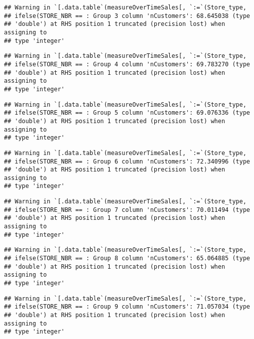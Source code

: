 \documentclass[
]{article}
\begin{document}
\begin{verbatim}
## Warning in `[.data.table`(measureOverTimeSales[, `:=`(Store_type,
## ifelse(STORE_NBR == : Group 3 column 'nCustomers': 68.645038 (type
## 'double') at RHS position 1 truncated (precision lost) when assigning to
## type 'integer'
\end{verbatim}

\begin{verbatim}
## Warning in `[.data.table`(measureOverTimeSales[, `:=`(Store_type,
## ifelse(STORE_NBR == : Group 4 column 'nCustomers': 69.783270 (type
## 'double') at RHS position 1 truncated (precision lost) when assigning to
## type 'integer'
\end{verbatim}

\begin{verbatim}
## Warning in `[.data.table`(measureOverTimeSales[, `:=`(Store_type,
## ifelse(STORE_NBR == : Group 5 column 'nCustomers': 69.076336 (type
## 'double') at RHS position 1 truncated (precision lost) when assigning to
## type 'integer'
\end{verbatim}

\begin{verbatim}
## Warning in `[.data.table`(measureOverTimeSales[, `:=`(Store_type,
## ifelse(STORE_NBR == : Group 6 column 'nCustomers': 72.340996 (type
## 'double') at RHS position 1 truncated (precision lost) when assigning to
## type 'integer'
\end{verbatim}

\begin{verbatim}
## Warning in `[.data.table`(measureOverTimeSales[, `:=`(Store_type,
## ifelse(STORE_NBR == : Group 7 column 'nCustomers': 70.011494 (type
## 'double') at RHS position 1 truncated (precision lost) when assigning to
## type 'integer'
\end{verbatim}

\begin{verbatim}
## Warning in `[.data.table`(measureOverTimeSales[, `:=`(Store_type,
## ifelse(STORE_NBR == : Group 8 column 'nCustomers': 65.064885 (type
## 'double') at RHS position 1 truncated (precision lost) when assigning to
## type 'integer'
\end{verbatim}

\begin{verbatim}
## Warning in `[.data.table`(measureOverTimeSales[, `:=`(Store_type,
## ifelse(STORE_NBR == : Group 9 column 'nCustomers': 71.057034 (type
## 'double') at RHS position 1 truncated (precision lost) when assigning to
## type 'integer'
\end{verbatim}
\end{document}
